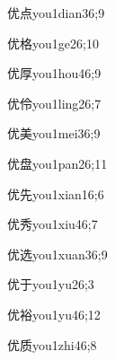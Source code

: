 \begin{verbete}{优点}{you1dian3}{6;9}
\end{verbete}

\begin{verbete}{优格}{you1ge2}{6;10}
\end{verbete}

\begin{verbete}{优厚}{you1hou4}{6;9}
\end{verbete}

\begin{verbete}{优伶}{you1ling2}{6;7}
\end{verbete}

\begin{verbete}{优美}{you1mei3}{6;9}
\end{verbete}

\begin{verbete}{优盘}{you1pan2}{6;11}
\end{verbete}

\begin{verbete}{优先}{you1xian1}{6;6}
\end{verbete}

\begin{verbete}{优秀}{you1xiu4}{6;7}
\end{verbete}

\begin{verbete}{优选}{you1xuan3}{6;9}
\end{verbete}

\begin{verbete}{优于}{you1yu2}{6;3}
\end{verbete}

\begin{verbete}{优裕}{you1yu4}{6;12}
\end{verbete}

\begin{verbete}{优质}{you1zhi4}{6;8}
\end{verbete}

